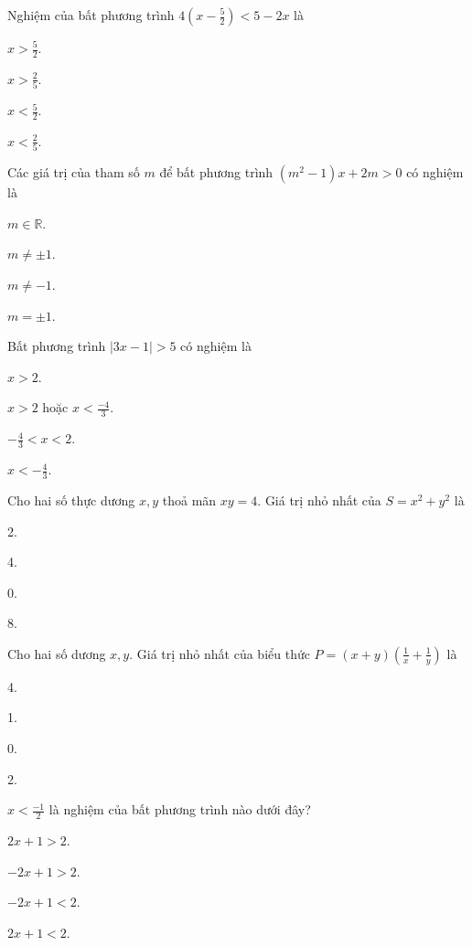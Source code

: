 \documentclass[%
    fontsize=12pt,%
    chapterprefix=false,%
    open=right,%
    twoside=false,%
    numbers=noenddot,%
    headings=optiontohead,%
    final,%
    DIV=15,%
    parskip=half %
]{scrbook}
\begin{document}
\begin{tracnghiem}
\item Nghiệm của bất phương trình $4\left(x - \frac{5}{2}\right) < 5 - 2x$ là
\begin{options}
  \item $x > \frac{5}{2}$.
  \item $x > \frac{2}{5}$.
  \item $x < \frac{5}{2}$.
  \item $x < \frac{2}{5}$.
\end{options}

\item Các giá trị của tham số $m$ để bất phương trình $(m^2 - 1)x + 2m > 0$ có nghiệm là
\begin{options}
  \item $m \in \mathbb{R}$.
  \item $m \neq \pm 1$.
  \item $m \neq -1$.
  \item $m = \pm 1$.
\end{options}

\item Bất phương trình $|3x - 1| > 5$ có nghiệm là
\begin{options}
  \item $x > 2$.
  \item $x > 2$ hoặc $x < \frac{-4}{3}$.
  \item $-\frac{4}{3} < x < 2$.
  \item $x < -\frac{4}{3}$.
\end{options}

\item Cho hai số thực dương $x, y$ thoả mãn $xy = 4$. Giá trị nhỏ nhất của $S = x^2 + y^2$ là
\begin{options}
  \item 2.
  \item 4.
  \item 0.
  \item 8.
\end{options}

\item Cho hai số dương $x, y$. Giá trị nhỏ nhất của biểu thức $P = (x + y)\left(\frac{1}{x} + \frac{1}{y}\right)$ là
\begin{options}
  \item 4.
  \item 1.
  \item 0.
  \item 2.
\end{options}

\item $x < \frac{-1}{2}$ là nghiệm của bất phương trình nào dưới đây?
\begin{options}
  \item $2x + 1 > 2$.
  \item $-2x + 1 > 2$.
  \item $-2x + 1 < 2$.
  \item $2x + 1 < 2$.
\end{options}


\end{tracnghiem}
\end{document}
